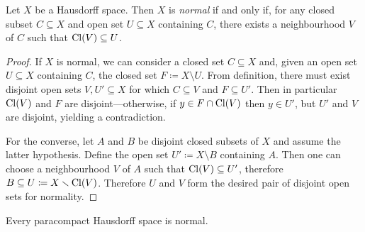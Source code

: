 \begin{lemma}
\label{lem:equivalent-definition-normal-space}
Let \(X\) be a Hausdorff space. Then \(X\) is \emph{normal} if and only if, for
any closed subset \(C \subseteq X\) and open set \(U \subseteq X\) containing
\(C\), there exists a neighbourhood \(V\) of \(C\) such that
\(\operatorname{Cl}(V) \subseteq U\).
\end{lemma}

\begin{proof}
If \(X\) is normal, we can consider a closed set \(C \subseteq X\) and, given an
open set \(U \subseteq X\) containing \(C\), the closed set
\(F \coloneq X \setminus U\). From definition, there must exist disjoint open
sets \(V, U' \subseteq X\) for which \(C \subseteq V\) and \(F \subseteq
U'\). Then in particular \(\operatorname{Cl}(V)\) and \(F\) are disjoint---otherwise, if
\(y \in F \cap \operatorname{Cl}(V)\) then \(y \in U'\), but \(U'\) and \(V\) are disjoint,
yielding a contradiction.

For the converse, let \(A\) and \(B\) be disjoint closed subsets of \(X\) and
assume the latter hypothesis. Define the open set \(U' \coloneq X \setminus B\)
containing \(A\). Then one can choose a neighbourhood \(V\) of \(A\) such that
\(\operatorname{Cl}(V) \subseteq U'\), therefore
\(B \subseteq U \coloneq X \smallsetminus \operatorname{Cl}(V)\). Therefore \(U\) and \(V\) form
the desired pair of disjoint open sets for normality.
\end{proof}

\begin{theorem}
\label{thm:paracompact-hausdorff-is-normal}
Every paracompact Hausdorff space is normal.
\end{theorem}

